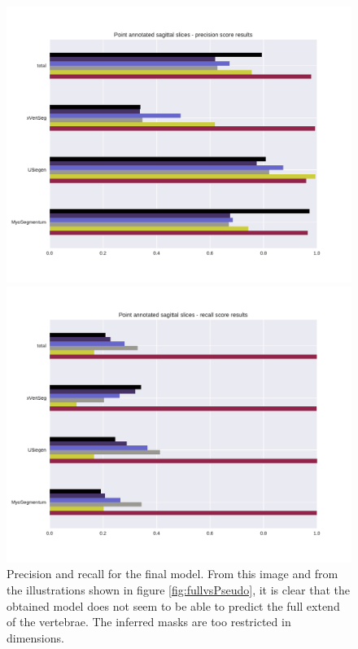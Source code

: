 \begin{figure}
    \centering
    \begin{minipage}{.99\textwidth}
        \includegraphics[width=.99\textwidth]{images/pointAnnotated_perClass_perSource_point_precision.pdf}
    \end{minipage} 
    \vspace{2 mm}
    \begin{minipage}{.99\textwidth}
        \includegraphics[width=.99\textwidth]{images/pointAnnotated_perClass_perSource_point_recall.pdf}
    \end{minipage} 
    \caption{Precision and recall for the final model. From this image and from the illustrations shown in figure \ref{fig:fullvsPseudo}, 
    it is clear that the obtained model does not seem to be able to predict the full extend of the vertebrae. The inferred masks are too restricted in dimensions.
    \protect
    }
\end{figure}

